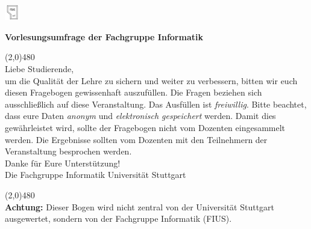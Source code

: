\documentclass[10pt,a4paper]{article}
\author{Dominik Kesim}
\begin{document}
\begin{floatingfigure}[r]{0.03\textwidth}
\centering
\includegraphics[width=0.05\textwidth]{fius-logo.png}
\end{floatingfigure}
\vspace{-1cm}
\textbf{Vorlesungsumfrage der Fachgruppe Informatik}

\vspace{0.3cm}
\line(2,0){480}
\\
Liebe Studierende,\\

um die Qualität der Lehre zu sichern und weiter zu verbessern, bitten wir euch diesen Fragebogen gewissenhaft auszufüllen. Die Fragen beziehen sich ausschließlich auf diese Veranstaltung. Das Ausfüllen ist \textit{freiwillig}. Bitte beachtet, dass eure Daten \textit{anonym} und \textit{elektronisch gespeichert} werden. Damit dies gewährleistet wird, sollte der Fragebogen nicht vom Dozenten eingesammelt werden. Die Ergebnisse sollten vom Dozenten mit den Teilnehmern der Veranstaltung besprochen werden.\\

Danke für Eure Unterstützung!\\
Die Fachgruppe Informatik Universität Stuttgart

\vspace{2pt}
\line(2,0){480}
\vspace{2pt}\\
\textbf{Achtung:} Dieser Bogen wird nicht zentral von der Universität Stuttgart ausgewertet, sondern von der Fachgruppe Informatik (FIUS).\\

\begin{Form}
 \hspace{1.5pt}
\end{Form}
\end{document}
